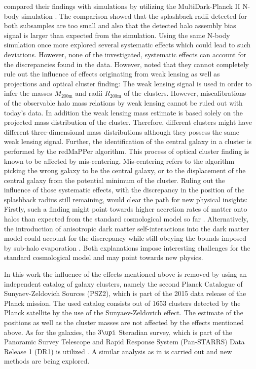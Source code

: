 \documentclass[a4paper,fleqn,usenatbib]{mnras}
\begin{document}
\citet{more2016detection} compared their findings with simulations by utilizing the MultiDark-Planck II N-body simulation \citep{klypin2016multidark}. The comparison showed that the splashback radii detected for both subsamples are too small and also that the detected halo assembly bias signal is larger than expected from the simulation. Using the same N-body simulation once more \citet{more2016detection} explored several systematic effects which could lead to such deviations. However, none of the investigated, systematic effects can account for the discrepancies found in the data. However, \citet{more2016detection} noted that they cannot completely rule out the influence of effects originating from weak lensing as well as projections and optical cluster finding: The weak lensing signal is used in order to infer the masses $M_{\mathrm{200m}}$ and radii $R_{\mathrm{200m}}$ of the clusters. However, miscalibrations of the observable halo mass relations by weak lensing cannot be ruled out with today's data. In addition the weak lensing mass estimate is based solely on the projected mass distribution of the cluster. Therefore, different clusters might have different three-dimensional mass distributions although they possess the same weak lensing signal. Further, the identification of the central galaxy in a cluster is performed by the redMaPPer algorithm. This process of optical cluster finding is known to be affected by mis-centering. Mis-centering refers to the algorithm picking the wrong galaxy to be the central galaxy, or to the displacement of the central galaxy from the potential minimum of the cluster. Ruling out the influence of those systematic effects, with the discrepancy in the position of the splashback radius still remaining, would clear the path for new physical insights: Firstly, such a finding might point towards higher accretion rates of matter onto halos than expected from the standard cosmological model so far \citep{adhikari2016observing}. Alternatively, the introduction of anisotropic dark matter self-interactions into the dark matter model could account for the discrepancy while still obeying the bounds imposed by sub-halo evaporation \citep{kahlhoefer2013colliding}. Both explanations impose interesting challenges for the standard cosmological model and may point towards new physics\citep{more2016detection}.

In this work the influence of the effects mentioned above is removed by using an independent catalog of galaxy clusters, namely the second Planck Catalogue of Sunyaev-Zeldovich Sources (PSZ2), which is part of the 2015 data release of the Planck mission. The used catalog consists out of 1653 clusters detected by the Planck satellite  \citep{collaboration2016planck} by the use of the Sunyaev-Zeldovich effect. The estimate of the positions as well as the cluster masses are not affected by the effects mentioned above. As for the galaxies, the $3\upi$ Steradian survey, which is part of the Panoramic Survey Telescope and Rapid Response System (Pan-STARRS) Data Release 1 (DR1) is utilized \citep{chambers2016pan}. A similar analysis as in \citep{more2016detection} is carried out and new methods are being explored.
\end{document}
